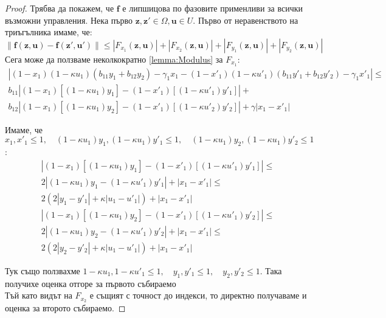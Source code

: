 \begin{proof}
  Трябва да покажем, че $\mathbf{f}$ е липшицова по фазовите применливи за всички възможни управления. Нека първо $\mathbf{z}, \mathbf{z}' \in \Omega, \mathbf{u} \in U$.
  Първо от неравенството на триъгълника имаме, че:
  \begin{equation}
    \|\mathbf{f}(\mathbf{z}, \mathbf{u}) - \mathbf{f}(\mathbf{z}', \mathbf{u}')\| \leq
    |F_{x_1}(\mathbf{z}, \mathbf{u})| + |F_{x_2}(\mathbf{z}, \mathbf{u})| + |F_{y_1}(\mathbf{z}, \mathbf{u})| + |F_{y_2}(\mathbf{z}, \mathbf{u})|
  \end{equation}
  Сега може да ползваме неколкократно \ref{lemma:Modulus} за $F_{x_1}$:
  \begin{multline}
    |(1-x_1) (1-\kappa u_1) \left(b_{11} y_1 + b_{12} y_2\right) - \gamma_1 x_1 - (1-x'_1) (1-\kappa u'_1) \left(b_{11} y'_1 + b_{12} y'_2\right) - \gamma_1 x'_1| \leq \\
    b_{11} \left|(1-x_1)[(1 - \kappa u_1) y_1] -  (1-x'_1)[(1 - \kappa u'_1) y'_1]\right| + \\
    b_{12} \left|(1-x_1)[(1 - \kappa u_1) y_2] -  (1-x'_1)[(1 - \kappa u'_2) y'_2]\right| + \gamma |x_1 - x'_1|
  \end{multline}

  Имаме, че $x_1, x'_1 \leq 1, \quad (1-\kappa u_1)y_1, (1-\kappa u_1) y'_1 \leq 1, \quad (1-\kappa u_1)y_2, (1-\kappa u_1) y'_2 \leq 1$:
  \begin{multline}
    \left|(1-x_1) [(1-\kappa u_1) y_1] - (1-x'_1) [(1-\kappa u'_1) y'_1]\right| \leq \\
    2 |(1-\kappa u_1) y_1 - (1-\kappa u'_1) y'_1| + |x_1 - x'_1| \leq \\
    2 (2|y_1 - y'_1| + \kappa |u_1 - u'_1|) + |x_1 - x'_1|
  \end{multline}
  \begin{multline}
    \left|(1-x_1) [(1-\kappa u_1) y_2] - (1-x'_1) [(1-\kappa u'_1) y'_2]\right| \leq \\
    2 |(1-\kappa u_1) y_2 - (1-\kappa u'_1) y'_2| + |x_1 - x'_1| \leq \\
    2 (2|y_2 - y'_2| + \kappa |u_1 - u'_1|) + |x_1 - x'_1|
  \end{multline}

  Тук също ползвахме $1-\kappa u_1, 1-\kappa u'_1 \leq 1, \quad y_1, y'_1 \leq 1, \quad y_2, y'_2 \leq 1$. Така получихе оценка отгоре за първото събираемо \\
  Тъй като видът на $F_{x_2}$ е същият с точност до индекси, то директно получаваме и оценка за второто събираемо.


\end{proof}
